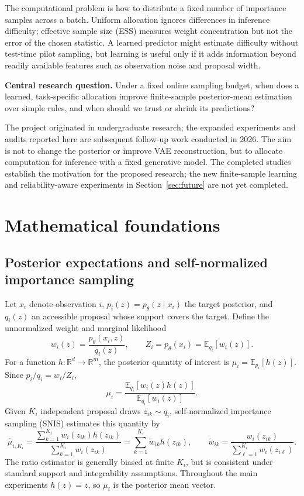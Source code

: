 \documentclass[11pt,letterpaper]{article}
\newcommand{\E}{\mathbb E}
\newcommand{\R}{\mathbb R}
\begin{document}
The computational problem is how to distribute a fixed number of importance samples across a batch. Uniform allocation ignores differences in inference difficulty; effective sample size (ESS) measures weight concentration but not the error of the chosen statistic. A learned predictor might estimate difficulty without test-time pilot sampling, but learning is useful only if it adds information beyond readily available features such as observation noise and proposal width.

\textbf{Central research question.} Under a fixed online sampling budget, when does a learned, task-specific allocation improve finite-sample posterior-mean estimation over simple rules, and when should we trust or shrink its predictions?

The project originated in undergraduate research; the expanded experiments and audits reported here are subsequent follow-up work conducted in 2026. The aim is not to change the posterior or improve VAE reconstruction, but to allocate computation for inference with a fixed generative model. The completed studies establish the motivation for the proposed research; the new finite-sample learning and reliability-aware experiments in Section~\ref{sec:future} are not yet completed.
\clearpage
\section{Mathematical foundations}
\subsection{Posterior expectations and self-normalized importance sampling}
Let $x_i$ denote observation $i$, $p_i(z)=p_\theta(z\mid x_i)$ the target posterior, and $q_i(z)$ an accessible proposal whose support covers the target. Define the unnormalized weight and marginal likelihood
\begin{equation}
 w_i(z)=\frac{p_\theta(x_i,z)}{q_i(z)},\qquad Z_i=p_\theta(x_i)=\E_{q_i}[w_i(z)].
 \label{eq:weights}
\end{equation}
For a function $h:\R^d\to\R^m$, the posterior quantity of interest is $\mu_i=\E_{p_i}[h(z)]$. Since $p_i/q_i=w_i/Z_i$,
\begin{equation}
 \mu_i=\frac{\E_{q_i}[w_i(z)h(z)]}{\E_{q_i}[w_i(z)]}.
\end{equation}
Given $K_i$ independent proposal draws $z_{ik}\sim q_i$, self-normalized importance sampling (SNIS) estimates this quantity by
\begin{equation}
 \widehat\mu_{i,K_i}=\frac{\sum_{k=1}^{K_i}w_i(z_{ik})h(z_{ik})}{\sum_{k=1}^{K_i}w_i(z_{ik})}
 =\sum_{k=1}^{K_i}\widetilde w_{ik}h(z_{ik}),\qquad
 \widetilde w_{ik}=\frac{w_i(z_{ik})}{\sum_{\ell=1}^{K_i}w_i(z_{i\ell})}.
 \label{eq:snis}
\end{equation}
The ratio estimator is generally biased at finite $K_i$, but is consistent under standard support and integrability assumptions. Throughout the main experiments $h(z)=z$, so $\mu_i$ is the posterior mean vector.
\end{document}
